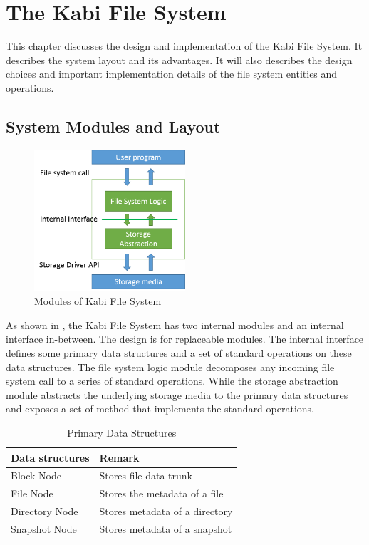 \chapter{The Kabi File System}
\label{chap:fs}

    This chapter discusses the design and implementation of the Kabi File System. It describes the system layout and its advantages. It will also describes the design choices and important implementation details of the file system entities and operations.

\section{System Modules and Layout}

\begin{figure}[t]
\centering
\includegraphics[width=0.5\textwidth]{Chapter-3/figs/fig8.png}
\caption{Modules of Kabi File System}
\label{fig:modules}
\end{figure}

    As shown in , the Kabi File System has two internal modules and an internal interface in-between. The design is for replaceable modules. The internal interface defines some primary data structures and a set of standard operations on these data structures. The file system logic module decomposes any incoming file system call to a series of standard operations. While the storage abstraction module abstracts the underlying storage media to the primary data structures and exposes a set of method that implements the standard operations.

\begin{table}[t]
\begin{center}
\begin{tabular}{ll}
\toprule
Data structures & Remark\\
\midrule
Block Node & Stores file data trunk\\
File Node & Stores the metadata of a file\\
Directory Node & Stores metadata of a directory \\
Snapshot Node & Stores metadata of a snapshot\\
\bottomrule
\end{tabular}
\end{center}
\caption{Primary Data Structures}
\label{tab:data_struct}
\end{table}

